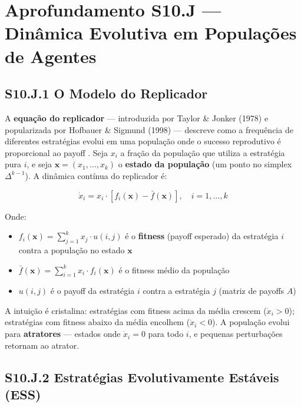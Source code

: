 
\section*{Aprofundamento S10.J --- Dinâmica Evolutiva em Populações de Agentes}

\subsection*{S10.J.1 O Modelo do Replicador}

A \textbf{equação do replicador} --- introduzida por Taylor \& Jonker (1978) e popularizada por Hofbauer \& Sigmund (1998) --- descreve como a frequência de diferentes estratégias evolui em uma população onde o sucesso reprodutivo é proporcional ao payoff \cite{hofbauer1998evolutionary}. Seja $x_i$ a fração da população que utiliza a estratégia pura $i$, e seja $\mathbf{x} = (x_1, \ldots, x_k)$ o \textbf{estado da população} (um ponto no simplex $\Delta^{k-1}$). A dinâmica contínua do replicador é:

\begin{equation}\label{eq:replicator_continuous}
\dot{x}_i = x_i \cdot \left[f_i(\mathbf{x}) - \bar{f}(\mathbf{x})\right], \quad i = 1, \ldots, k
\end{equation}

Onde:
\begin{itemize}
    \item $f_i(\mathbf{x}) = \sum_{j=1}^{k} x_j \cdot u(i, j)$ é o \textbf{fitness} (payoff esperado) da estratégia $i$ contra a população no estado $\mathbf{x}$
    \item $\bar{f}(\mathbf{x}) = \sum_{i=1}^{k} x_i \cdot f_i(\mathbf{x})$ é o fitness médio da população
    \item $u(i, j)$ é o payoff da estratégia $i$ contra a estratégia $j$ (matriz de payoffs $A$)
\end{itemize}

A intuição é cristalina: estratégias com fitness acima da média crescem ($\dot{x}_i > 0$); estratégias com fitness abaixo da média encolhem ($\dot{x}_i < 0$). A população evolui para \textbf{atratores} --- estados onde $\dot{x}_i = 0$ para todo $i$, e pequenas perturbações retornam ao atrator.

\subsection*{S10.J.2 Estratégias Evolutivamente Estáveis (ESS)}

